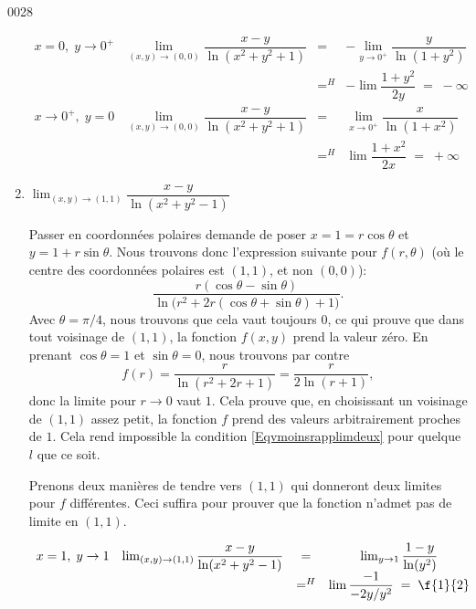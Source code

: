 \begin{corrige}{0028}
\begin{enumerate}
\begin{alternative}
    \[\begin{array}{cccc} 

	x= 0, \; y\rightarrow  0^+ & \lim_{(x,y)\rightarrow (0,0)} \dfrac{x-y}{\ln(x^2+y^2+1)} & =& -\lim_{y\rightarrow 0^+}\dfrac{y}{\ln(1+y^2)} \\
	 & &=^H&-\lim\dfrac{1+y^2}{2y} \;= \; -\infty \\

	x\rightarrow 0^+, \; y=0 & \lim_{(x,y)\rightarrow (0,0)} \dfrac{x-y}{\ln(x^2+y^2+1) } & = & \lim_{x\rightarrow 0^+}\dfrac{x}{\ln(1+x^2)} \\
	& &=^H&\lim\dfrac{1+x^2}{2x} \;= \; +\infty 
     \end{array}\]

\end{alternative}


\item   $\lim_{(x,y)\rightarrow (1,1)} \dfrac{x-y}{\ln(x^2+y^2-1)}$

Passer en coordonnées polaires demande de poser $x=1=r\cos\theta$ et $y=1+r\sin\theta$. Nous trouvons donc l'expression suivante pour $f(r,\theta)$ (où le centre des coordonnées polaires est $(1,1)$, et non $(0,0)$):
\begin{equation}
	\frac{ r(\cos\theta-\sin\theta) }{ \ln\big( r^2+2r(\cos\theta+\sin\theta)+1 \big) }.
\end{equation}
Avec $\theta=\pi/4$, nous trouvons que cela vaut toujours $0$, ce qui prouve que dans tout voisinage de $(1,1)$, la fonction $f(x,y)$ prend la valeur zéro. En prenant $\cos\theta=1$ et $\sin\theta=0$, nous trouvons par contre
\begin{equation}
	f(r)=\frac{ r }{ \ln(r^2+2r+1) }=\frac{ r }{ 2\ln(r+1) },
\end{equation}
donc la limite pour $r\to 0$ vaut $1$. Cela prouve que, en choisissant un voisinage de $(1,1)$ assez petit, la fonction $f$ prend des valeurs arbitrairement proches de $1$. Cela rend impossible la condition \eqref{Eqvmoinsrapplimdeux} pour quelque $l$ que ce soit.

\begin{alternative}
	Prenons deux manières de tendre vers $(1,1)$ qui donneront deux limites pour $f$ différentes. Ceci suffira pour prouver que la fonction n'admet pas de limite en $(1,1)$.

    \[\begin{array}{cccc} 

	x= 1, \; y\rightarrow  1 & \lim_{(x,y)\rightarrow (1,1)} \dfrac{x-y}{\ln(x^2+y^2-1)} & =& \lim_{y\rightarrow 1}\dfrac{1-y}{\ln(y^2)} \\
	 & &=^H&\lim\dfrac{-1}{-2y/y^2} \;= \; \f{1}{2}\\


\end{array}\]
\end{alternative}
\end{enumerate}
\end{corrige}
